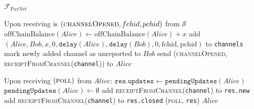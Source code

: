 \begin{functionality}{$\mathcal{F}_{\mathrm{PayNet}}$}
\begin{algorithmic}[1]
      \State Upon receiving is $\left(\textsc{channelOpened},   
      fchid, pchid \right)$  from $\mathcal{S}$
      \Indent
      \State {}
      \State $\mathrm{offChainBalance}\left(Alice\right) \gets
      \mathrm{offChainBalance}\left(Alice\right) + x$
      \State add $\left(Alice, Bob, x, 0, \mathtt{delay}\left(Alice\right),
      \mathtt{delay}\left(Bob\right), 0, \mathrm{fchid}, \mathrm{pchid}\right)$ to
      \texttt{channels}
      \State mark newly added channel as unreported to $Bob$
      \State send (\textsc{channelOpened},
      \textsc{receiptFromChannel}(\texttt{channel})) to $Alice$
    \EndIndent
    \State

    \State Upon receiving $\left(\textsc{poll}\right)$ from $Alice$:
    \Indent
      \State {}
      \State {} 
      \State $\mathtt{res.updates} \gets
      \mathtt{pendingUpdates}\left(Alice\right)$
      \State $\mathtt{pendingUpdates}\left(Alice\right) \gets \emptyset$
        \State add \textsc{receiptFromChannel}(\texttt{channel}) to
        \texttt{res.new}
      \EndFor
        \State add \textsc{receiptFromChannel}(\texttt{channel}) to
        \texttt{res.closed}
      \EndFor
      \State \Return (\textsc{poll}, \texttt{res}) $Alice$
    \EndIndent
    \State


\end{algorithmic}
\end{functionality}
